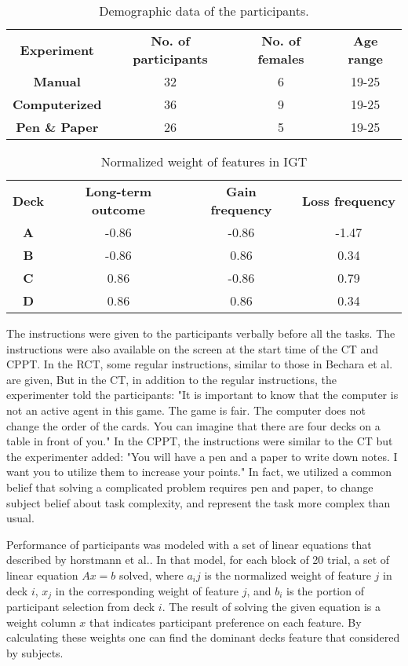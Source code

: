 \documentclass[12pt,twocolumn]{elsarticle}
\begin{document}
\begin{table*}
\caption{Demographic data of the
participants.}
\label{table:demographic}
\centering
\begin{tabular}{cccc}
\textbf{Experiment} & \textbf{No. of
participants} & \textbf{No. of females}
& \textbf{Age range} \\ 
\textbf{Manual} & 32  & 6 & 19-25 \\ 
\textbf{Computerized} & 36  &  9 & 19-25 \\ 
\textbf{Pen \& Paper} & 26  & 5 &  19-25 \\ 
\end{tabular} 
\end{table*}

\begin{table*}
\caption{Normalized weight of features in IGT}
\label{table:igt_features}
\centering
\begin{tabular}{cccc}
\textbf{Deck} & \textbf{Long-term outcome} & \textbf{Gain frequency} & \textbf{Loss frequency} \\ 
\textbf{A} & -0.86  & -0.86 & -1.47 \\ 
\textbf{B} & -0.86  &  0.86 &  0.34 \\ 
\textbf{C} &  0.86  & -0.86 &  0.79 \\ 
\textbf{D} &  0.86  &  0.86 &  0.34 \\ 
\end{tabular} 
\end{table*}

The instructions were given to the
participants verbally before all the
tasks.  The instructions were also
available on the screen at the start
time of the CT and CPPT. In the RCT,
some regular instructions, similar to
those in Bechara et al. are given, But
in the CT, in addition to the regular
instructions, the experimenter told the
participants: "It is important to know
that the computer is not an active agent
in this game. The game is fair. The
computer does not change the order of
the cards. You can imagine that there
are four decks on a table in front of
you." In the CPPT, the instructions were
similar to the CT but the experimenter
added: "You will have a pen and a paper
to write down notes. I want you to
utilize them to increase your points."
In fact, we utilized a common belief
that solving a complicated problem
requires pen and paper, to change
subject belief about task complexity,
and represent the task more complex than
usual.


Performance of participants was modeled
with a set of linear equations that
described by horstmann et al.. In that
model, for each block of 20 trial, a set
of linear equation $Ax = b$ solved,
where $a_ij$ is the normalized weight of
feature $j$ in deck $i$, $x_j$ in the
corresponding weight of feature $j$, and
$b_i$ is the portion of participant
selection from deck $i$. The result of
solving the given equation is a weight
column $x$ that indicates participant
preference on each feature. By
calculating these weights one can find
the dominant decks feature that
considered by subjects.
\end{document}
